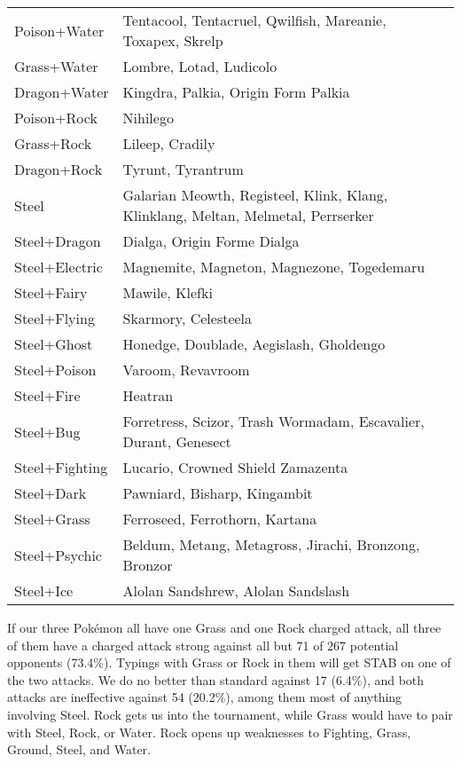 \begin{table}
\begin{tabular}{lp{.7\linewidth}}
Poison+Water & Tentacool, Tentacruel, Qwilfish, Mareanie, Toxapex, Skrelp\\
Grass+Water & Lombre, Lotad, Ludicolo\\
Dragon+Water & Kingdra, Palkia, Origin Form Palkia\\
Poison+Rock & Nihilego\\
Grass+Rock & Lileep, Cradily\\
Dragon+Rock & Tyrunt, Tyrantrum\\
Steel & Galarian Meowth, Registeel, Klink, Klang, Klinklang, Meltan, Melmetal, Perrserker\\
Steel+Dragon & Dialga, Origin Forme Dialga\\
Steel+Electric & Magnemite, Magneton, Magnezone, Togedemaru \\
Steel+Fairy & Mawile, Klefki\\
Steel+Flying & Skarmory, Celesteela \\
Steel+Ghost & Honedge, Doublade, Aegislash, Gholdengo\\
Steel+Poison & Varoom, Revavroom\\
Steel+Fire & Heatran\\
Steel+Bug & Forretress, Scizor, Trash Wormadam, Escavalier, Durant, Genesect\\
Steel+Fighting & Lucario, Crowned Shield Zamazenta\\
Steel+Dark & Pawniard, Bisharp, Kingambit\\
Steel+Grass & Ferroseed, Ferrothorn, Kartana\\
Steel+Psychic & Beldum, Metang, Metagross, Jirachi, Bronzong, Bronzor\\
Steel+Ice & Alolan Sandshrew, Alolan Sandslash\\
\end{tabular}
\end{table}

If our three Pokémon all have one Grass and one Rock charged attack,
  all three of them have a charged attack strong against all but
  71 of 267 potential opponents (73.4\%).
Typings with Grass or Rock in them will get STAB on one of the two attacks.
We do no better than standard against 17 (6.4\%), and both attacks are
  ineffective against 54 (20.2\%), among them most of anything involving
  Steel.
Rock gets us into the tournament, while Grass would have to pair with Steel,
  Rock, or Water.
Rock opens up weaknesses to Fighting, Grass, Ground, Steel, and Water.

